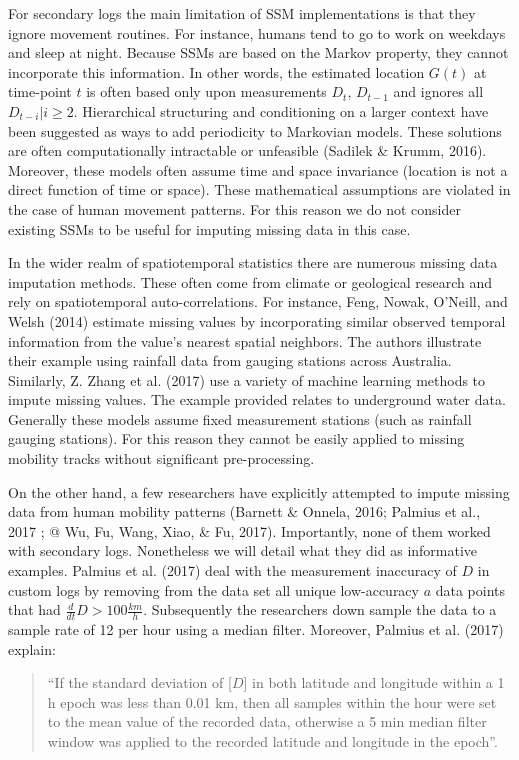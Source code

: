 \documentclass[man]{apa6}
\theoremstyle{definition}
\theoremstyle{definition}
\theoremstyle{definition}
\theoremstyle{remark}
\begin{document}
For secondary logs the main limitation of SSM implementations is that
they ignore movement routines. For instance, humans tend to go to work
on weekdays and sleep at night. Because SSMs are based on the Markov
property, they cannot incorporate this information. In other words, the
estimated location \(G(t)\) at time-point \(t\) is often based only upon
measurements \(D_t\), \(D_{t-1}\) and ignores all \(D_{t-i}|i\geq2\).
Hierarchical structuring and conditioning on a larger context have been
suggested as ways to add periodicity to Markovian models. These
solutions are often computationally intractable or unfeasible (Sadilek
\& Krumm, 2016). Moreover, these models often assume time and space
invariance (location is not a direct function of time or space). These
mathematical assumptions are violated in the case of human movement
patterns. For this reason we do not consider existing SSMs to be useful
for imputing missing data in this case.

In the wider realm of spatiotemporal statistics there are numerous
missing data imputation methods. These often come from climate or
geological research and rely on spatiotemporal auto-correlations. For
instance, Feng, Nowak, O'Neill, and Welsh (2014) estimate missing values
by incorporating similar observed temporal information from the value's
nearest spatial neighbors. The authors illustrate their example using
rainfall data from gauging stations across Australia. Similarly, Z.
Zhang et al. (2017) use a variety of machine learning methods to impute
missing values. The example provided relates to underground water data.
Generally these models assume fixed measurement stations (such as
rainfall gauging stations). For this reason they cannot be easily
applied to missing mobility tracks without significant pre-processing.

On the other hand, a few researchers have explicitly attempted to impute
missing data from human mobility patterns (Barnett \& Onnela, 2016;
Palmius et al., 2017 ; @ Wu, Fu, Wang, Xiao, \& Fu, 2017). Importantly,
none of them worked with secondary logs. Nonetheless we will detail what
they did as informative examples. Palmius et al. (2017) deal with the
measurement inaccuracy of \(D\) in custom logs by removing from the data
set all unique low-accuracy \(a\) data points that had
\(\frac{d}{dt}D > 100 \frac{km}{h}\). Subsequently the researchers down
sample the data to a sample rate of 12 per hour using a median filter.
Moreover, Palmius et al. (2017) explain:

\begin{quote}
\enquote{If the standard deviation of {[}\(D\){]} in both latitude and
longitude within a 1 h epoch was less than 0.01 km, then all samples
within the hour were set to the mean value of the recorded data,
otherwise a 5 min median filter window was applied to the recorded
latitude and longitude in the epoch}.
\end{quote}
\end{document}
